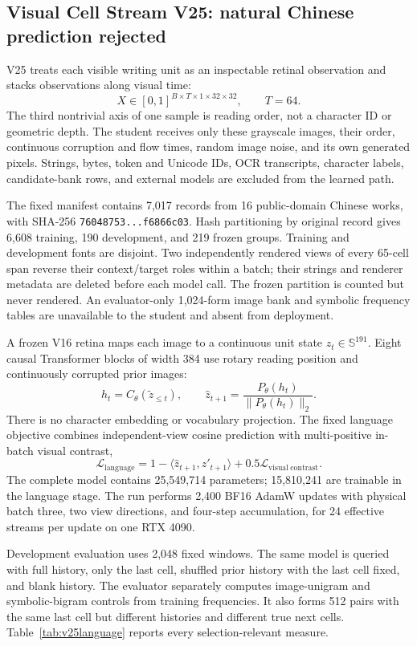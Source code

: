 \documentclass[11pt]{article}
\begin{document}
\clearpage
\subsection{Visual Cell Stream V25: natural Chinese prediction rejected}

V25 treats each visible writing unit as an inspectable retinal observation and
stacks observations along visual time:
\[
X\in[0,1]^{B\times T\times1\times32\times32},\qquad T=64.
\]
The third nontrivial axis of one sample is reading order, not a character ID or
geometric depth. The student receives only these grayscale images, their
order, continuous corruption and flow times, random image noise, and its own
generated pixels. Strings, bytes, token and Unicode IDs, OCR transcripts,
character labels, candidate-bank rows, and external models are excluded from
the learned path.

The fixed manifest contains 7,017 records from 16 public-domain Chinese works,
with SHA-256
\texttt{76048753...f6866c03}. Hash partitioning by original record gives 6,608
training, 190 development, and 219 frozen groups. Training and development
fonts are disjoint. Two independently rendered views of every 65-cell span
reverse their context/target roles within a batch; their strings and renderer
metadata are deleted before each model call. The frozen partition is counted
but never rendered. An evaluator-only 1,024-form image bank and symbolic
frequency tables are unavailable to the student and absent from deployment.

A frozen V16 retina maps each image to a continuous unit state
$z_t\in\mathbb S^{191}$. Eight causal Transformer blocks of width 384 use
rotary reading position and continuously corrupted prior images:
\[
h_t=C_\theta(\tilde z_{\le t}),\qquad
\hat z_{t+1}=\frac{P_\theta(h_t)}{\lVert P_\theta(h_t)\rVert_2}.
\]
There is no character embedding or vocabulary projection. The fixed language
objective combines independent-view cosine prediction with multi-positive
in-batch visual contrast,
\[
\mathcal L_{\mathrm{language}}=
1-\langle\hat z_{t+1},z'_{t+1}\rangle
+0.5\mathcal L_{\mathrm{visual\ contrast}}.
\]
The complete model contains 25,549,714 parameters; 15,810,241 are trainable in
the language stage. The run performs 2,400 BF16 AdamW updates with physical
batch three, two view directions, and four-step accumulation, for 24 effective
streams per update on one RTX 4090.

Development evaluation uses 2,048 fixed windows. The same model is queried
with full history, only the last cell, shuffled prior history with the last
cell fixed, and blank history. The evaluator separately computes image-unigram
and symbolic-bigram controls from training frequencies. It also forms 512
pairs with the same last cell but different histories and different true next
cells. Table~\ref{tab:v25language} reports every selection-relevant measure.
\end{document}

